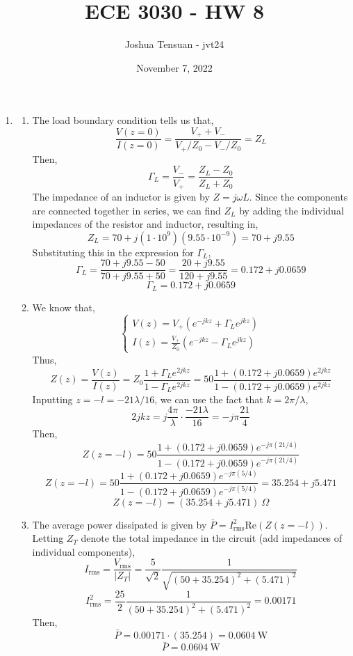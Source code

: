 \documentclass[12pt]{article}
\begin{document}
\usetikzlibrary{scopes}
\def\iangle{35} %

\def\down{-90}
\def\arcr{0.5cm} %

\title{ECE 3030 - HW 8}
\author{Joshua Tensuan - jvt24}
\date{November 7, 2022}
\maketitle


\begin{enumerate}
	\item [8.1]
	\begin{enumerate}
		\item [(a)]
		The load boundary condition tells us that,
		\[\frac{V(z=0)}{I(z=0)}=\frac{V_++V_-}{V_+/Z_0-V_-/Z_0}=Z_L\]
		Then,
		\[\Gamma_L=\frac{V_-}{V_+}=\frac{Z_L-Z_0}{Z_L+Z_0}\]
		The impedance of an inductor is given by $Z=j\omega L$.
		Since the components are connected together in series, we can find $Z_L$ by adding the individual impedances of the resistor and inductor, resulting in,
		\[Z_L = 70+j(1\cdot 10^9)(9.55\cdot 10^{-9})=70 + j9.55\]
		Substituting this in the expression for $\Gamma_L$,
		\[\Gamma_L = \frac{70 + j9.55 - 50}{70+j9.55+50}=\frac{20 + j9.55}{120+j9.55}=0.172+j0.0659\]
		\[\boxed{\Gamma_L = 0.172+j0.0659}\]

		\item [(b)]
		We know that,
		\[\begin{cases}
			V(z)=V_+\left(e^{-jkz}+\Gamma_Le^{jkz}\right) \\ 
			I(z)=\frac{V_+}{Z_0}\left(e^{-jkz}-\Gamma_Le^{jkz}\right)
		\end{cases}\]
		Thus,
		\[Z(z)=\frac{V(z)}{I(z)}=Z_0\frac{1+\Gamma_Le^{2jkz}}{1-\Gamma_Le^{2jkz}}=50\frac{1+(0.172+j0.0659)e^{2jkz}}{1-(0.172+j0.0659)e^{2jkz}}\]
		Inputting $z=-l=-21\lambda/16$, we can use the fact that $k=2\pi/\lambda$,
		\[2jkz = j\frac{4\pi}{\lambda}\cdot\frac{-21\lambda}{16}=-j\pi\frac{21}{4}\]
		Then,
		\[Z(z=-l)=50\frac{1+(0.172+j0.0659)e^{-j\pi(21/4)}}{1-(0.172+j0.0659)e^{-j\pi (21/4)}}\]
		\[Z(z=-l)=50\frac{1+(0.172+j0.0659)e^{-j\pi(5/4)}}{1-(0.172+j0.0659)e^{-j\pi (5/4)}}=35.254+j5.471\]
		\[\boxed{Z(z=-l)=\left(35.254+j5.471\right)\: \Omega}\]

		\item [(c)]
		The average power dissipated is given by $\bar P = I^2_{\mathrm{rms}}\mathrm{Re}(Z(z=-l))$.
		Letting $Z_T$ denote the total impedance in the circuit (add impedances of individual components),
		\[I_{\mathrm{rms}}=\frac{V_{\mathrm{rms}}}{|Z_T|}=\frac{5}{\sqrt{2}}\frac{1}{\sqrt{(50+35.254)^2+(5.471)^2}}\]
		\[I^2_{\mathrm{rms}}=\frac{25}{2}\frac{1}{(50+35.254)^2+(5.471)^2}=0.00171\]
		Then,
		\[\bar P = 0.00171 \cdot (35.254)=0.0604 \: \mathrm{W}\]
		\[\boxed{\bar P = 0.0604 \: \mathrm{W}}\]


\end{enumerate}
\end{enumerate}
\end{document}
